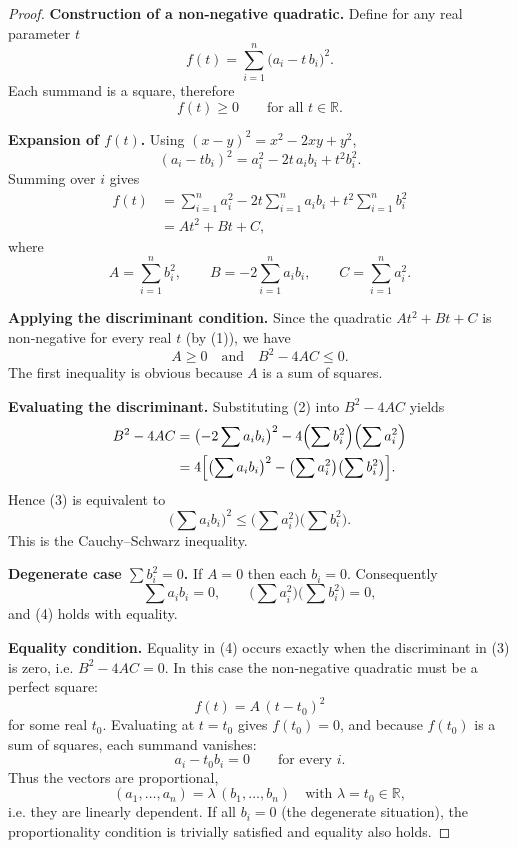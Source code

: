 \begin{proof}
\textbf{Construction of a non‑negative quadratic.} Define for any real parameter \(t\)
\[
f(t)=\sum_{i=1}^{n}\bigl(a_i-t\,b_i\bigr)^2 .
\]
Each summand is a square, therefore
\begin{equation}
f(t)\ge 0\qquad\text{for all }t\in\mathbb{R}. \tag{1}
\end{equation}

\textbf{Expansion of \(f(t)\).} Using \((x-y)^2=x^2-2xy+y^2\),
\[
(a_i-t b_i)^2=a_i^2-2t\,a_i b_i+t^2 b_i^2 .
\]
Summing over \(i\) gives
\begin{align*}
f(t)&=\sum_{i=1}^{n}a_i^{2}-2t\sum_{i=1}^{n}a_i b_i
     +t^{2}\sum_{i=1}^{n}b_i^{2}\\
    &=A t^{2}+B t+C,
\end{align*}
where
\[
A=\sum_{i=1}^{n}b_i^{2},\qquad
B=-2\sum_{i=1}^{n}a_i b_i,\qquad
C=\sum_{i=1}^{n}a_i^{2}. \tag{2}
\]

\textbf{Applying the discriminant condition.} Since the quadratic \(A t^{2}+B t+C\) is non‑negative for every real \(t\) (by (1)), we have
\begin{equation}
A\ge 0\quad\text{and}\quad B^{2}-4AC\le 0. \tag{3}
\end{equation}
The first inequality is obvious because \(A\) is a sum of squares.

\textbf{Evaluating the discriminant.} Substituting (2) into \(B^{2}-4AC\) yields
\begin{align*}
B^{2}-4AC&=\bigl(-2\sum a_i b_i\bigr)^{2}
          -4\Bigl(\sum b_i^{2}\Bigr)\Bigl(\sum a_i^{2}\Bigr)\\
        &=4\Bigl[\bigl(\sum a_i b_i\bigr)^{2}
                -\bigl(\sum a_i^{2}\bigr)\bigl(\sum b_i^{2}\bigr)\Bigr].
\end{align*}
Hence (3) is equivalent to
\begin{equation}
\bigl(\sum a_i b_i\bigr)^{2}\le
\bigl(\sum a_i^{2}\bigr)\bigl(\sum b_i^{2}\bigr). \tag{4}
\end{equation}
This is the Cauchy–Schwarz inequality.

\textbf{Degenerate case \(\sum b_i^{2}=0\).} If \(A=0\) then each \(b_i=0\). Consequently
\[
\sum a_i b_i=0,\qquad
\bigl(\sum a_i^{2}\bigr)\bigl(\sum b_i^{2}\bigr)=0,
\]
and (4) holds with equality.

\textbf{Equality condition.} Equality in (4) occurs exactly when the discriminant in (3) is zero, i.e. \(B^{2}-4AC=0\). In this case the non‑negative quadratic must be a perfect square:
\[
f(t)=A\,(t-t_{0})^{2}
\]
for some real \(t_{0}\). Evaluating at \(t=t_{0}\) gives \(f(t_{0})=0\), and because \(f(t_{0})\) is a sum of squares, each summand vanishes:
\[
a_i-t_{0}b_i=0\qquad\text{for every }i.
\]
Thus the vectors are proportional,
\[
(a_{1},\dots ,a_{n})=\lambda\,(b_{1},\dots ,b_{n})\quad\text{with }\lambda=t_{0}\in\mathbb{R},
\]
i.e. they are linearly dependent. If all \(b_i=0\) (the degenerate situation), the proportionality condition is trivially satisfied and equality also holds.
\end{proof}